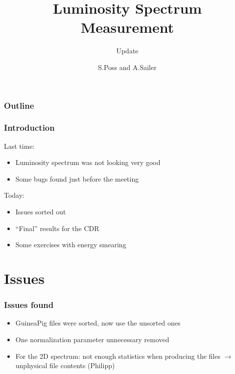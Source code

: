 \documentclass{beamer}
\author{S.Poss and A.Sailer}
\title{Luminosity Spectrum Measurement}
\subtitle{Update}
\begin{document}
\begin{frame}
\titlepage 
\end{frame}
\begin{frame}
\frametitle{Outline}
\tableofcontents
\end{frame}

\begin{frame}
\frametitle{Introduction}
Last time:
\begin{itemize}
  \item Luminosity spectrum was not looking very good
  \item Some bugs found just before the meeting
\end{itemize}
Today:
\begin{itemize}
  \item Issues sorted out
  \item ``Final'' results for the CDR
  \item Some exercises with energy smearing 
\end{itemize}
\end{frame}

\section{Issues}
\begin{frame}
\frametitle{Issues found}
\begin{itemize}
  \item GuineaPig files were sorted, now use the unsorted ones
  \item One normalization parameter unnecessary removed
  \item For the 2D spectrum: not enough statistics when producing the files
  $\to$ unphysical file contents (Philipp)
\end{itemize}
\end{frame}
\end{document}
